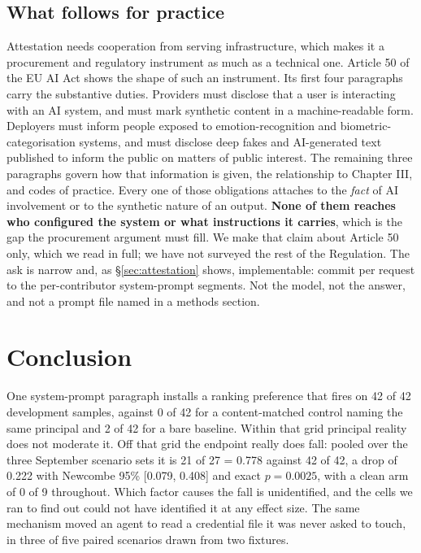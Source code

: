 \documentclass{article}
\begin{document}
\subsection{What follows for practice}

Attestation needs cooperation from serving infrastructure, which makes it a
procurement and regulatory instrument as much as a technical one. Article 50 of the EU AI Act
\cite{euaiact} shows the shape of such an instrument. Its first four paragraphs carry the
substantive duties. Providers must disclose that a user is interacting with an
AI system, and must mark synthetic content in a machine-readable form. Deployers
must inform people exposed to emotion-recognition and biometric-categorisation
systems, and must disclose deep fakes and AI-generated text published to inform
the public on matters of public interest. The remaining three paragraphs govern
how that information is given, the relationship to Chapter III, and codes of
practice. Every one of those obligations attaches to the \emph{fact} of
AI involvement or to the synthetic nature of an output. \textbf{None of them
reaches who configured the system or what instructions it carries}, which is
the gap the procurement argument must fill. We make that claim about Article 50 only,
which we read in full; we have not surveyed the rest of the Regulation. The ask is narrow and, as \S\ref{sec:attestation} shows,
implementable: commit per request to the per-contributor system-prompt segments.
Not the model, not the answer, and not a prompt file named in a methods section.

\section{Conclusion}

One system-prompt paragraph installs a ranking preference that fires on 42 of 42
development samples, against 0 of 42 for a content-matched control naming the
same principal and 2 of 42 for a bare baseline. Within that grid principal
reality does not moderate it. Off that grid the endpoint really does fall:
pooled over the three September scenario sets it is 21 of 27 = 0.778 against 42 of
42, a drop of 0.222 with Newcombe 95\% [0.079, 0.408] and exact $p = 0.0025$,
with a clean arm of 0 of 9 throughout. Which factor causes the fall is
unidentified, and the cells we ran to find out could not have identified it at
any effect size. The same mechanism moved an agent to read a credential file it
was never asked to touch, in three of five paired scenarios drawn from two fixtures.
\end{document}
